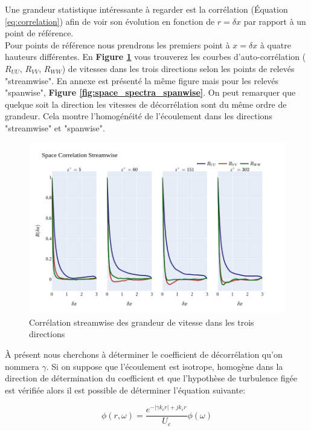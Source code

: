 \documentclass[12pt]{article}   %
\theoremstyle{plain}
\theoremstyle{remark}
\begin{document}
Une grandeur statistique intéressante à regarder est la corrélation (Équation \ref{eq:correlation}) afin de voir son évolution en fonction de $r=\delta x$ par rapport à un point de référence.\\
Pour points de référence nous prendrons les premiers point à $x=\delta x$ à quatre hauteurs différentes. En {\bf Figure \ref{fig:space_spectra}} vous trouverez les courbes d'auto-corrélation ($R_{UU}$, $R_{VV}$, $R_{WW}$) de vitesses dans les trois directions selon les points de relevés "streamwise". En annexe est présenté la même figure mais pour les relevés "spanwise", {\bf Figure \ref{fig:space_spectra_spanwise}}. On peut remarquer que quelque soit la direction les vitesses de décorrélation sont du même ordre de grandeur. Cela montre l'homogénéité de l'écoulement dans les directions "streamwise" et "spanwise". \\


\begin{figure}[H]
	\begin{center}
		\includegraphics[width=0.8\linewidth]{../../output/figures/channel_wrles_retau395/split_time/space_correlation/streamwise.png}
		\caption{Corrélation streamwise des grandeur de vitesse dans les trois directions}
		\label{fig:space_spectra}
	\end{center}
\end{figure}

À présent nous cherchons à déterminer le coefficient de décorrélation qu'on nommera $\gamma$. Si on suppose que l'écoulement est isotrope, homogène dans la direction de détermination du coefficient et que l'hypothèse de turbulence figée est vérifiée alors il est possible de déterminer l'équation suivante: 

\begin{equation}
	\phi(r, \omega) = \frac{e^{-|\gamma k_c r| + jk_cr}}{U_c}\phi(\omega)
	\label{eq:funct}
\end{equation} 
\end{document}

